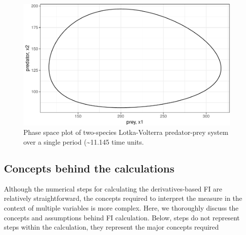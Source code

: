\documentclass[12pt,twoside,openany]{reedthesis}
\begin{document}
\begin{figure}
\centering
\includegraphics{_myDissertation_files/figure-latex/pp1Period-1.pdf}
\caption{\label{fig:pp1Period}Phase space plot of two-species Lotka-Volterra predator-prey system over a single period (\textasciitilde{}11.145 time units.}
\end{figure}
\hypertarget{concepts-behind-the-calculations}{%
\subsection{Concepts behind the calculations}\label{concepts-behind-the-calculations}}

Although the numerical steps for calculating the derivatives-based FI are relatively straightforward, the concepts required to interpret the measure in the context of multiple variables is more complex. Here, we thoroughly discuss the concepts and assumptions behind FI calculation. Below, steps do not represent steps within the calculation, they represent the major concepts required
\end{document}

